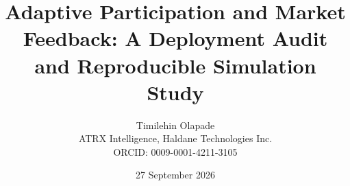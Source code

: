 \documentclass[10pt,letterpaper]{article}
\title{Adaptive Participation and Market Feedback: A Deployment Audit and Reproducible Simulation Study}
\author{Timilehin Olapade\\ATRX Intelligence, Haldane Technologies Inc.\\\small ORCID: 0009-0001-4211-3105}
\date{27 September 2026}
\begin{document}
\maketitle
\begin{abstract}\end{abstract}

\clearpage


\clearpage\appendix
\end{document}
